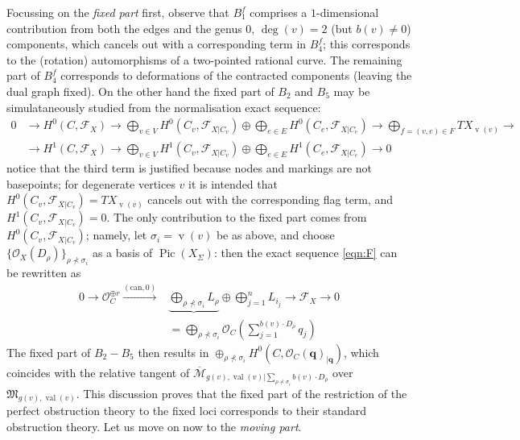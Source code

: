 \documentclass[11pt]{amsart}
\newcommand{\OO}{\mathcal{O}}
\renewcommand{\to}{\rightarrow}
\newcommand{\F}{\mathcal F}
\newcommand{\Pic}{\operatorname{Pic}}
\newcommand{\val}{\operatorname{val}}
\newcommand{\vv}{\operatorname{v}}
\theoremstyle{definition}
\theoremstyle{definition}
\begin{document}
Focussing on the \emph{fixed part} first, observe that $B_1^f$ comprises a $1$-dimensional contribution from both the edges and the genus $0$, $\deg(v)=2$ (but $b(v)\neq 0$) components, which cancels out with a corresponding term in $B_4^f$; this corresponds to the (rotation) automorphisms of a two-pointed rational curve. The remaining part of $B_4^f$ corresponds to deformations of the contracted components (leaving the dual graph fixed). On the other hand the fixed part of $B_2$ and $B_5$ may be simulataneously studied from the normalisation exact sequence:
\begin{equation}\label{eqn:normalisation}
\begin{aligned}
 0&\to H^0(C,\F_X)\to \bigoplus_{v\in V}H^0(C_v,\F_{X|C_v})\oplus \bigoplus_{e\in E}H^0(C_e,\F_{X|C_e})\to \bigoplus_{f=(v,e)\in F} TX_{\vv(v)}\to \\
 &\to H^1(C,\F_X)\to \bigoplus_{v\in V}H^1(C_v,\F_{X|C_v})\oplus \bigoplus_{e\in E}H^1(C_e,\F_{X|C_e})\to 0
\end{aligned} 
\end{equation}
notice that the third term is justified because nodes and markings are not basepoints; for degenerate vertices $v$ it is intended that $H^0(C_v,\F_{X|C_v})=TX_{\vv(v)}$ cancels out with the corresponding flag term, and $H^1(C_v,\F_{X|C_v})=0$. The only contribution to the fixed part comes from $H^0(C_v,\F_{X|C_v})$; namely, let $\sigma_i=\vv(v)$ be as above, and choose $\{\OO_X(D_\rho)\}_{\rho\nprec\sigma_i}$ as a basis of $\Pic(X_\Sigma)$: then the exact sequence \eqref{eqn:F} can be rewritten as
\begin{equation}\label{eqn:Fbasis}
 \begin{aligned}
 0\to\OO_C^{\oplus r}\xrightarrow{\left(\text{can},0\right)} & \underbrace{\bigoplus_{\rho\nprec\sigma_i} L_\rho}\oplus\bigoplus_{j=1}^n L_{i_j}\to\F_X\to 0 \\
 & = \bigoplus_{\rho\nprec\sigma_i}\OO_C(\sum_{j=1}^{b(v)\cdot D_\rho}q_j)
\end{aligned}
\end{equation}
The fixed part of $B_2-B_5$ then results in $\oplus_{\rho\nprec\sigma_i}H^0(C,\OO_C(\mathbf q)_{|\mathbf q})$, which coincides with the relative tangent of $\overline{\mathcal M}_{g(v),\val(v)|\sum_{\rho\nprec\sigma_i}b(v)\cdot D_\rho}$ over $\mathfrak M_{g(v),\val(v)}$. This discussion proves that the fixed part of the restriction of the perfect obstruction theory to the fixed loci corresponds to their standard obstruction theory. Let us move on now to the \emph{moving part}.
\end{document}
